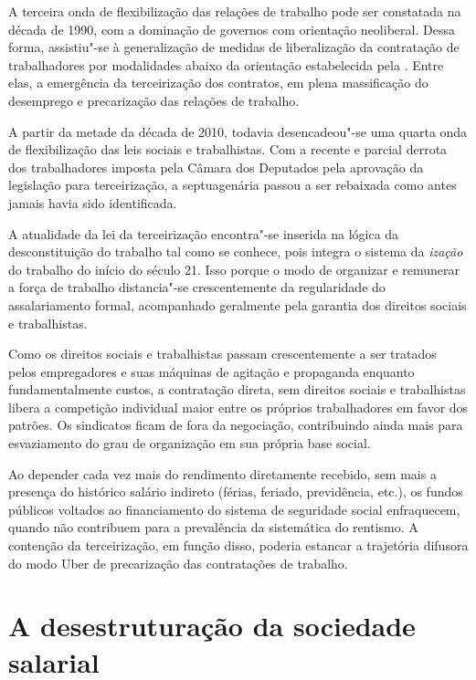 A terceira onda de flexibilização das relações de trabalho pode ser
constatada na década de 1990, com a dominação de governos com orientação
neoliberal. Dessa forma, assistiu"-se à generalização de medidas de
liberalização da contratação de trabalhadores por modalidades abaixo da
orientação estabelecida pela . Entre elas, a emergência da
terceirização dos contratos, em plena massificação do desemprego e
precarização das relações de trabalho.

A partir da metade da década de 2010, todavia desencadeou"-se uma quarta
onda de flexibilização das leis sociais e trabalhistas. Com a recente e
parcial derrota dos trabalhadores imposta pela Câmara dos Deputados pela
aprovação da legislação para terceirização, a septuagenária  passou a
ser rebaixada como antes jamais havia sido identificada.

A atualidade da lei da terceirização encontra"-se inserida na lógica da
desconstituição do trabalho tal como se conhece, pois integra o sistema
da \emph{ização} do trabalho do início do século 21. Isso porque o
modo  de organizar e remunerar a força de trabalho distancia"-se
crescentemente da regularidade do assalariamento formal, acompanhado
geralmente pela garantia dos direitos sociais e trabalhistas.

Como os direitos sociais e trabalhistas passam crescentemente a ser
tratados pelos empregadores e suas máquinas de agitação e propaganda
enquanto fundamentalmente custos, a contratação direta, sem direitos
sociais e trabalhistas libera a competição individual maior entre os
próprios trabalhadores em favor dos patrões. Os sindicatos ficam de fora
da negociação, contribuindo ainda mais para esvaziamento do grau de
organização em sua própria base social.

Ao depender cada vez mais do rendimento diretamente recebido, sem mais a
presença do histórico salário indireto (férias, feriado, previdência,
etc.), os fundos públicos voltados ao financiamento do sistema de
seguridade social enfraquecem, quando não contribuem para a prevalência
da sistemática do rentismo. A contenção da terceirização, em função
disso, poderia estancar a trajetória difusora do modo Uber de
precarização das contratações de trabalho.

\section{A desestruturação da sociedade salarial}

